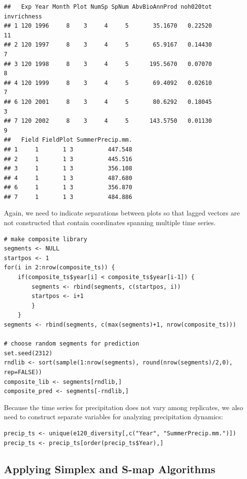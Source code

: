 \begin{lstlisting}[backgroundcolor=\color{white}, commentstyle=\ttfamily]
##   Exp Year Month Plot NumSp SpNum AbvBioAnnProd noh020tot invrichness
## 1 120 1996     8    3     4     5       35.1670   0.22520          11
## 2 120 1997     8    3     4     5       65.9167   0.14430           7
## 3 120 1998     8    3     4     5      195.5670   0.07070           8
## 4 120 1999     8    3     4     5       69.4092   0.02610           7
## 6 120 2001     8    3     4     5       80.6292   0.18045           3
## 7 120 2002     8    3     4     5      143.5750   0.01130           9
##   Field FieldPlot SummerPrecip.mm.
## 1     1       1 3          447.548
## 2     1       1 3          445.516
## 3     1       1 3          356.108
## 4     1       1 3          487.680
## 6     1       1 3          356.870
## 7     1       1 3          484.886
\end{lstlisting}

Again, we need to indicate separations between plots so that lagged vectors are not constructed that contain coordinates spanning multiple time series.

\begin{lstlisting}
# make composite library
segments <- NULL
startpos <- 1
for(i in 2:nrow(composite_ts)) {
    if(composite_ts$year[i] < composite_ts$year[i-1]) {
        segments <- rbind(segments, c(startpos, i))
        startpos <- i+1
        }
    }
segments <- rbind(segments, c(max(segments)+1, nrow(composite_ts)))

# choose random segments for prediction
set.seed(2312)
rndlib <- sort(sample(1:nrow(segments), round(nrow(segments)/2,0), rep=FALSE))
composite_lib <- segments[rndlib,]
composite_pred <- segments[-rndlib,]
\end{lstlisting}

Because the time series for precipitation does not vary among replicates, we also need to construct separate variables for analyzing precipitation dynamics:
 
\begin{lstlisting}
precip_ts <- unique(e120_diversity[,c("Year", "SummerPrecip.mm.")])
precip_ts <- precip_ts[order(precip_ts$Year),]
\end{lstlisting}

\subsection{Applying Simplex and S-map Algorithms}

